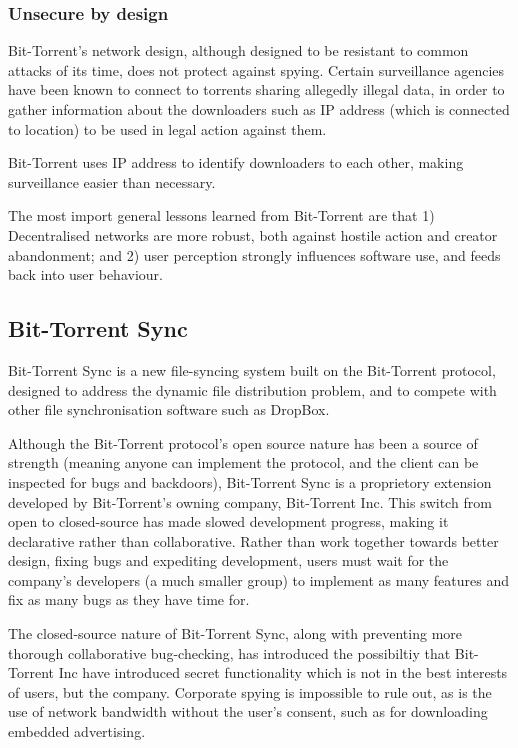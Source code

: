\documentclass[12pt,a4paper,]{adreport}
\begin{document}
\subsubsection{Unsecure by design}\label{unsecure-by-design}

Bit-Torrent's network design, although designed to be resistant to
common attacks of its time, does not protect against spying. Certain
surveillance agencies have been known to connect to torrents sharing
allegedly illegal data, in order to gather information about the
downloaders such as IP address (which is connected to location) to be
used in legal action against them.

Bit-Torrent uses IP address to identify downloaders to each other,
making surveillance easier than necessary.

The most import general lessons learned from Bit-Torrent are that 1)
Decentralised networks are more robust, both against hostile action and
creator abandonment; and 2) user perception strongly influences software
use, and feeds back into user behaviour.

\subsection{Bit-Torrent Sync}\label{bit-torrent-sync}

Bit-Torrent Sync is a new file-syncing system built on the Bit-Torrent
protocol, designed to address the dynamic file distribution problem, and
to compete with other file synchronisation software such as DropBox.

Although the Bit-Torrent protocol's open source nature has been a source
of strength (meaning anyone can implement the protocol, and the client
can be inspected for bugs and backdoors), Bit-Torrent Sync is a
proprietory extension developed by Bit-Torrent's owning company,
Bit-Torrent Inc. This switch from open to closed-source has made slowed
development progress, making it declarative rather than collaborative.
Rather than work together towards better design, fixing bugs and
expediting development, users must wait for the company's developers (a
much smaller group) to implement as many features and fix as many bugs
as they have time for.

The closed-source nature of Bit-Torrent Sync, along with preventing more
thorough collaborative bug-checking, has introduced the possibiltiy that
Bit-Torrent Inc have introduced secret functionality which is not in the
best interests of users, but the company. Corporate spying is impossible
to rule out, as is the use of network bandwidth without the user's
consent, such as for downloading embedded advertising.
\end{document}
